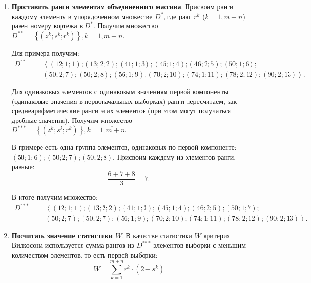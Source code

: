 \documentclass[a4paper,12pt]{article}
\begin{document}
\begin{enumerate}
\item \textbf{Проставить ранги элементам объединенного массива}.
Присвоим ранги каждому элементу в упорядоченном множестве $ D^* $, где ранг $ r^k $ ($ k=\overline{1,m+n} $) равен номеру кортежа в $ D^* $. Получим множество $ D^{**} =\left\lbrace \left( z^k; s^k; r^k\right) \right\rbrace, k=\overline{1,m+n}$.

Для примера получим:
\begin{eqnarray*}
D^{**}&=&\left\langle  \left( 12; 1; 1\right);  \left( 13; 2; 2\right); \left( 41; 1; 3\right) ; \left( 45; 1; 4 \right) ; \left( 46; 2; 5\right) ;\left( 50; 1; 6\right) ;    \right. \\
 & &\left.\left( 50; 2; 7\right) ; \left( 50; 2; 8\right) ; \left( 56; 1; 9\right); \left( 70; 2; 10 \right) ;  \left( 74; 1; 11\right) ; \left( 78; 2; 12\right) ; \left( 90; 2; 13\right) \right\rangle  .
\end{eqnarray*}

Для одинаковых элементов с одинаковым значениям первой компоненты (одинаковые значения в первоначальных выборках) ранги пересчитаем, как среднеарифметические ранги этих элементов (при этом могут получаться дробные значения). Получим множество $ D^{***} =\left\lbrace \left( z^k; s^k; r^k\right) \right\rbrace, k=\overline{1,m+n}$.

В примере есть одна группа элементов, одинаковых по первой компоненте: $\left( 50; 1; 6\right); \left( 50; 2; 7\right) ; \left( 50; 2; 8\right)$. Присвоим каждому из элементов ранги, равные:
\begin{equation*}
\dfrac{6+7+8}{3}=7.
\end{equation*}

В итоге получим множество:
\begin{eqnarray*}
D^{***}&=&\left\langle  \left( 12; 1; 1\right);  \left( 13; 2; 2\right); \left( 41; 1; 3\right) ; \left( 45; 1; 4 \right) ; \left( 46; 2; 5\right) ;\left( 50; 1; 7\right) ;    \right. \\
 & &\left.\left( 50; 2; 7\right) ; \left( 50; 2; 7\right) ; \left( 56; 1; 9\right); \left( 70; 2; 10 \right) ;  \left( 74; 1; 11\right) ; \left( 78; 2; 12\right) ; \left( 90; 2; 13\right) \right\rangle  .
\end{eqnarray*}

\item \textbf{Посчитать значение статистики $W$}.
В качестве статистики $W$ критерия Вилкосона используется сумма рангов из $ D^{***}$ элементов выборки с меньшим количеством элементов, то есть первой выборки:
\begin{equation}
W = \sum_{k=1}^{m+n}{r^k\cdot \left( 2 - s^k\right) }
\end{equation}


\end{enumerate}
\end{document}
